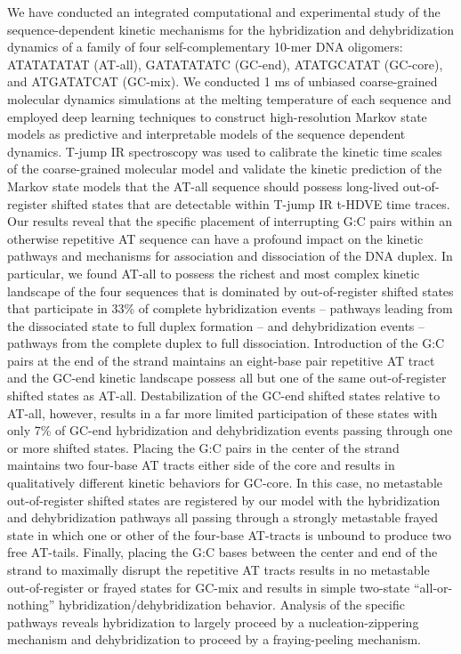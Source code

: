 \documentclass[journal=jpcbfk,manuscript=article]{achemso}
\newcommand*{\rood}[1]{{#1}}
\begin{document}
We have conducted an integrated computational and experimental study of the sequence-dependent kinetic mechanisms for the hybridization and dehybridization dynamics of a family of four self-complementary 10-mer DNA oligomers: ATATATATAT (AT-all), GATATATATC (GC-end), ATATGCATAT (GC-core), and ATGATATCAT (GC-mix). We conducted 1 ms of unbiased coarse-grained molecular dynamics simulations \rood{at the melting temperature of each sequence} and employed deep learning techniques to construct high-resolution Markov state models as predictive and interpretable models of the sequence dependent dynamics. T-jump IR spectroscopy was used to calibrate the kinetic time scales of the coarse-grained molecular model and validate the kinetic prediction of the Markov state models that the AT-all sequence should possess long-lived out-of-register shifted states that are detectable within T-jump IR t-HDVE time traces. Our results reveal that the specific placement of interrupting G:C pairs within an otherwise repetitive AT sequence can have a profound impact on the kinetic pathways and mechanisms for association and dissociation of the DNA duplex. In particular, we found AT-all to possess the richest and most complex kinetic landscape of the four sequences that is dominated by out-of-register shifted states that participate in 33\% of complete hybridization events -- pathways leading from the dissociated state to full duplex formation -- and dehybridization events -- pathways from the complete duplex to full dissociation. Introduction of the G:C pairs at the end of the strand maintains an eight-base pair repetitive AT tract and the GC-end kinetic landscape possess all but one of the same out-of-register shifted states as AT-all. Destabilization of the GC-end shifted states relative to AT-all, however, results in a far more limited participation of these states with only 7\% of GC-end hybridization and dehybridization events passing through one or more shifted states. Placing the G:C pairs in the center of the strand maintains two four-base AT tracts either side of the core and results in qualitatively different kinetic behaviors for GC-core. In this case, no metastable out-of-register shifted states are registered by our model with the hybridization and dehybridization pathways all passing through a strongly metastable frayed state in which one or other of the four-base AT-tracts is unbound to produce two free AT-tails. Finally, placing the G:C bases between the center and end of the strand to maximally disrupt the repetitive AT tracts results in no metastable out-of-register or frayed states for GC-mix and results in simple two-state ``all-or-nothing'' hybridization/dehybridization behavior. Analysis of the specific pathways reveals hybridization to largely proceed by a nucleation-zippering mechanism and dehybridization to proceed by a fraying-peeling mechanism. 
\end{document}
